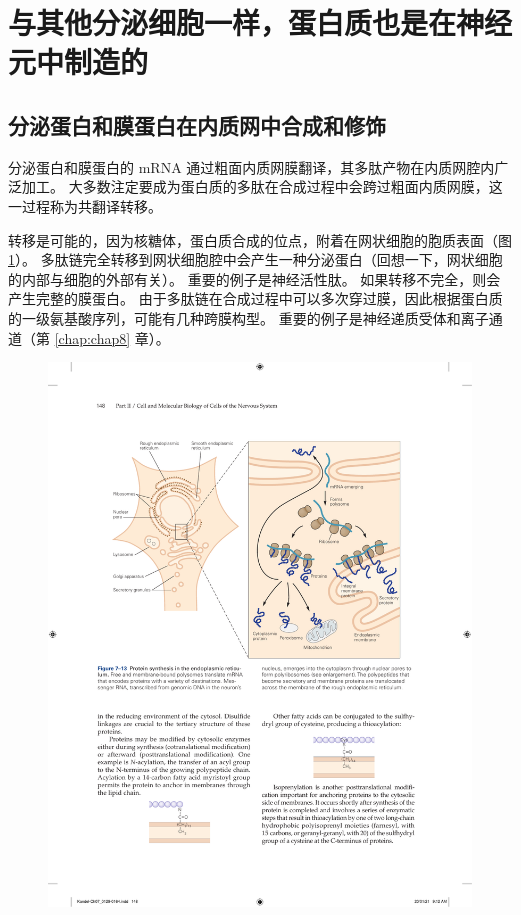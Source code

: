 \section{与其他分泌细胞一样，蛋白质也是在神经元中制造的}
\subsection{分泌蛋白和膜蛋白在内质网中合成和修饰}
分泌蛋白和膜蛋白的 mRNA 通过粗面内质网膜翻译，其多肽产物在内质网腔内广泛加工。 
大多数注定要成为蛋白质的多肽在合成过程中会跨过粗面内质网膜，这一过程称为共翻译转移。


转移是可能的，因为核糖体，蛋白质合成的位点，附着在网状细胞的胞质表面（图 \ref{fig:7_13}）。 
多肽链完全转移到网状细胞腔中会产生一种分泌蛋白（回想一下，网状细胞的内部与细胞的外部有关）。 
重要的例子是神经活性肽。 
如果转移不完全，则会产生完整的膜蛋白。 
由于多肽链在合成过程中可以多次穿过膜，因此根据蛋白质的一级氨基酸序列，可能有几种跨膜构型。 
重要的例子是神经递质受体和离子通道（第 \ref{chap:chap8} 章）。

\begin{figure}[htbp]
	\centering
	\includegraphics[width=1.0\linewidth]{chap07/fig_7_13}
	\caption{}
	\label{fig:7_13}
\end{figure}


